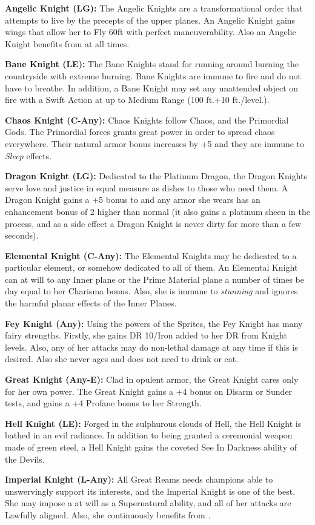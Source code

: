 \begin{itemize*}
\item \textbf{Angelic Knight (LG):} The Angelic Knights are a transformational order that attempts to live by the precepts of the upper planes. An Angelic Knight gains wings that allow her to Fly 60ft with perfect maneuverability. Also an Angelic Knight benefits from  at all times.
\item \textbf{Bane Knight (LE):}  The Bane Knights stand for running around burning the countryside with extreme burning. Bane Knights are immune to fire and do not have to breathe. In addition, a Bane Knight may set any unattended object on fire with a Swift Action at up to Medium Range (100 ft.+10 ft./level.).
\item \textbf{Chaos Knight (C-Any):}  Chaos Knights follow Chaos, and the Primordial Gods. The Primordial forces grants great power in order to spread chaos everywhere. Their natural armor bonus increases by +5 and they are immune to \textit{Sleep} effects.
\item \textbf{Dragon Knight (LG):}  Dedicated to the Platinum Dragon, the Dragon Knights serve love and justice in equal measure as dishes to those who need them. A Dragon Knight gains a +5 bonus to  and any armor she wears has an enhancement bonus of 2 higher than normal (it also gains a platinum sheen in the process, and as a side effect a Dragon Knight is never dirty for more than a few seconds).
\item \textbf{Elemental Knight (C-Any):}  The Elemental Knights may be dedicated to a particular element, or somehow dedicated to all of them. An Elemental Knight can  at will to any Inner plane or the Prime Material plane a number of times be day equal to her Charisma bonus. Also, she is immune to \textit{stunning} and ignores the harmful planar effects of the Inner Planes.
\item \textbf{Fey Knight (Any):}  Using the powers of the Sprites, the Fey Knight has many fairy strengths. Firstly, she gains DR 10/Iron added to her DR from Knight levels. Also, any of her attacks may do non-lethal damage at any time if this is desired. Also she never ages and does not need to drink or eat.
\item \textbf{Great Knight (Any-E):}  Clad in opulent armor, the Great Knight cares only for her own power. The Great Knight gains a +4 bonus on Disarm or Sunder tests, and gains a +4 Profane bonus to her Strength.
\item \textbf{Hell Knight (LE):}  Forged in the sulphurous clouds of Hell, the Hell Knight is bathed in an evil radiance. In addition to being granted a ceremonial weapon made of green steel, a Hell Knight gains the coveted See In Darkness ability of the Devils.
\item \textbf{Imperial Knight (L-Any):}  All Great Reams needs champions able to unswervingly support its interests, and the Imperial Knight is one of the best. She may impose a  at will as a Supernatural ability, and all of her attacks are Lawfully aligned. Also, she continuously benefits from .
\end{itemize*}

